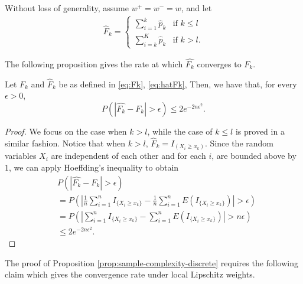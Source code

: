 
Without loss of generality, assume $w^+=w^-=w$, and let
\begin{align}
\label{eq:hatFk}
\hat F_k = 
\begin{cases}
   \sum_{i=1}^k \hat p_k & \text{if   } k \leq l \\
   \sum_{i=k}^K \hat p_k & \text{if  }  k > l.
\end{cases}  
\end{align}

The following proposition gives the rate at which $\hat{F_k}$ converges to $F_k$.
\begin{proposition}
\label{prop:hoeffding-discrete}
Let $F_k$ and $\hat F_k$ be as defined in \eqref{eq:Fk}, \eqref{eq:hatFk}, Then, we have that, for every $\epsilon >0$, 
$$P(|\hat{F_k}-F_k| > \epsilon) \leq 2 e^{-2n \epsilon^2}.$$
\end{proposition}
\begin{proof}
We focus on the case when $k > l$, while the case of $k \leq l$ is proved in a similar fashion.
Notice that when $k>l$,  $\hat F_k =I_{(X_i \geq  x_k) }$. Since the random variables $X_i$ are independent of each other and  for each $i$, are bounded above by $1$, we can apply Hoeffding's inequality to obtain 
\begin{align*}
&P(\left|\hat{F_k}- F_k \right| > \epsilon)  \\
&= P(\left| \frac{1}{n} \sum_{i=1}^n I_{\{X_i \geq
x_k\}} - \frac{1}{n} \sum_{i=1}^n E(I_{\{X_i \geq x_k\}}) \right| > \epsilon) \\ & = P(\left|
\sum_{i=1}^n I_{\{X_i \geq x_k\}} - \sum_{i=1}^n E(I_{\{X_i \geq x_k\}}) \right| > n\epsilon) \\ &
    \leq 2e^{-2n \epsilon^2}.
\end{align*}
\end{proof}

The proof of Proposition \ref{prop:sample-complexity-discrete} requires the following claim which gives the convergence rate under local Lipschitz weights. 

